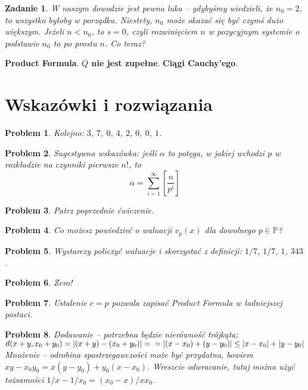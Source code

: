 \documentclass[a4paper,fleqn,9pt]{extarticle}
\newtheorem{prbh}{Zadanie}
\newtheorem{sol}{Problem}
\begin{document}
\begin{prbh}W naszym dowodzie jest pewna luka -- gdybyśmy wiedzieli, że $n_0 = 2$, to wszystko byłoby w porządku. Niestety, $n_0$ może okazać się być czymś dużo większym. Jeżeli $n < n_0$, to $s = 0$, czyli rozwinięciem $n$ w pozycyjnym systemie o podstawie $n_0$ to po prostu $n$. Co teraz?\end{prbh}
\textbf{Product Formula}. \textbf{$Q$ nie jest zupełne}. \textbf{Ciągi Cauchy'ego}.



\newpage
\section*{Wskazówki i rozwiązania}

\begin{sol}Kolejno: $3$, $7$, $0$, $4$, $2$, $0$, $0$, $1$.\end{sol}
\begin{sol}Sugestywna wskazówka: jeśli $\alpha$ to potęga, w jakiej wchodzi $p$ w rozkładzie na czynniki pierwsze $n!$, to\begin{equation*}\alpha = \sum_{i=1}^{\infty} \left[\frac{n}{p^i}\right]\end{equation*}\end{sol}
\begin{sol}Patrz poprzednie ćwiczenie.\end{sol}
\begin{sol}Co możesz powiedzieć o waluacji $v_p(x)$ dla dowolnego $p\in\mathbb P$?\end{sol}
\begin{sol}Wystarczy policzyć waluacje i skorzystać z definicji: $1/7$, $1/7$, $1$, $343$.\end{sol}
\begin{sol}Zero!\end{sol}
\begin{sol}Ustalenie $c=p$ pozwala zapisać Product Formula w ładniejszej postaci.\end{sol}

\begin{sol}Dodawanie -- potrzebna będzie nierówność trójkąta:
$d(x+y, x_0 + y_0) = |(x+y) -(x_0+y_0) | =\\= |(x-x_0)+ (y-y_0)| \le |x-x_0| + |y-y_0|$
Mnożenie -- odrobina spostrzegawczości może być przydatna, bowiem $xy - x_0y_0 = x(y-y_0) + y_0(x-x_0)$. Wreszcie odwracanie, tutaj można użyć tożsamości $1/x - 1/{x_0} = {(x_0-x)}/{xx_0}$.\end{sol}
\end{document}
